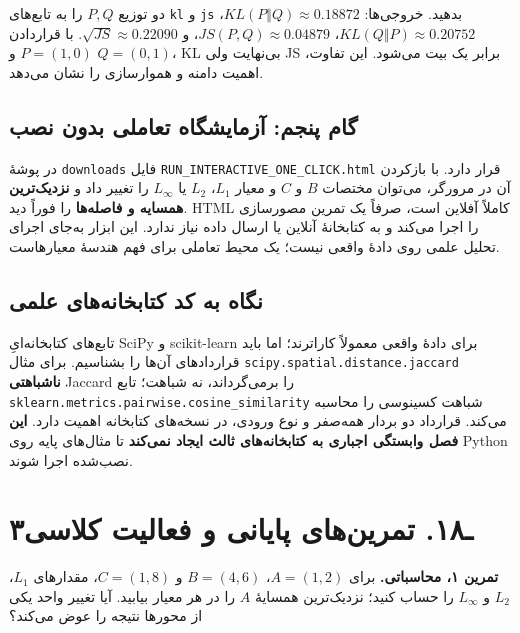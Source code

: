 \documentclass[12pt,a4paper,oneside]{book}
\begin{document}
دو توزیع \(P,Q\) را به تابع‌های \texttt{kl} و \texttt{js} بدهید. خروجی‌ها: \(KL(P\Vert Q)\approx0.18872\)، \(KL(Q\Vert P)\approx0.20752\)، \(JS(P,Q)\approx0.04879\)، و \(\sqrt{JS}\approx0.22090\). با قراردادن \(P=(1,0)\) و \(Q=(0,1)\)، KL بی‌نهایت ولی JS برابر یک بیت می‌شود. این تفاوت، اهمیت دامنه و هموارسازی را نشان می‌دهد.

\subsection{گام پنجم: آزمایشگاه تعاملی بدون نصب}\label{ux6afux627ux645-ux67eux646ux62cux645-ux622ux632ux645ux627ux6ccux634ux6afux627ux647-ux62aux639ux627ux645ux644ux6cc-ux628ux62fux648ux646-ux646ux635ux628}

در پوشهٔ \texttt{downloads} فایل \texttt{RUN\_INTERACTIVE\_ONE\_CLICK.html} قرار دارد. با بازکردن آن در مرورگر، می‌توان مختصات \(B\) و \(C\) و معیار \(L_1\)، \(L_2\) یا \(L_\infty\) را تغییر داد و \textbf{نزدیک‌ترین همسایه و فاصله‌ها} را فوراً دید. HTML کاملاً آفلاین است، صرفاً یک تمرین مصورسازی را اجرا می‌کند و به کتابخانهٔ آنلاین یا ارسال داده نیاز ندارد. این ابزار به‌جای اجرای تحلیل علمی روی دادهٔ واقعی نیست؛ یک محیط تعاملی برای فهم هندسهٔ معیارهاست.

\subsection{نگاه به کد کتابخانه‌های علمی}\label{ux646ux6afux627ux647-ux628ux647-ux6a9ux62f-ux6a9ux62aux627ux628ux62eux627ux646ux647ux647ux627ux6cc-ux639ux644ux645ux6cc}

تابع‌های کتابخانه‌ایِ SciPy و scikit-learn برای دادهٔ واقعی معمولاً کاراترند؛ اما باید قراردادهای آن‌ها را بشناسیم. برای مثال \texttt{scipy.spatial.distance.jaccard} \textbf{ناشباهتی} Jaccard را برمی‌گرداند، نه شباهت؛ تابع \texttt{sklearn.metrics.pairwise.cosine\_similarity} شباهت کسینوسی را محاسبه می‌کند. قرارداد دو بردار همه‌صفر و نوع ورودی، در نسخه‌های کتابخانه اهمیت دارد. \textbf{این فصل وابستگی اجباری به کتابخانه‌های ثالث ایجاد نمی‌کند} تا مثال‌های پایه روی Python نصب‌شده اجرا شوند.

\section{۳ـ۱۸. تمرین‌های پایانی و فعالیت کلاسی}\label{ux640ux6f1ux6f8.-ux62aux645ux631ux6ccux646ux647ux627ux6cc-ux67eux627ux6ccux627ux646ux6cc-ux648-ux641ux639ux627ux644ux6ccux62a-ux6a9ux644ux627ux633ux6cc}

\textbf{تمرین ۱، محاسباتی.} برای \(A=(1,2)\)، \(B=(4,6)\) و \(C=(1,8)\)، مقدارهای \(L_1\)، \(L_2\) و \(L_\infty\) را حساب کنید؛ نزدیک‌ترین همسایهٔ \(A\) را در هر معیار بیابید. آیا تغییر واحد یکی از محورها نتیجه را عوض می‌کند؟
\end{document}
